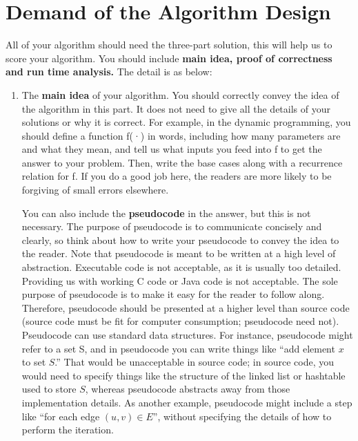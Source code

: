\documentclass[10.5pt]{article}
\newenvironment{main idea}{\textbf{Main Idea: }}{}
\theoremstyle{remark}
\begin{document}
\section*{Demand of the Algorithm Design}
All of your algorithm should need the three-part solution, this will help us to score your algorithm. You should include {\large\textbf{main idea,  proof of correctness and run time analysis.}} The detail is as below:
\begin{enumerate}

	\item The {\textbf{main idea}} of your algorithm. You should correctly convey the idea of the algorithm in this part. It does not need to give all the details of your solutions or why it is correct. For example, in the dynamic programming, you should define a function f(·) in words, including how many parameters are and what they mean, and tell us what inputs you feed into f to get the answer to your problem. Then, write the base cases along with a recurrence relation for f. If you do a good job here, the readers are more likely to be forgiving of small errors elsewhere.

	      You can also include the {\textbf{pseudocode}} in the answer, but this is not necessary. The purpose of pseudocode is to communicate concisely and clearly, so think about how to write your pseudocode to convey the idea to the
	      reader.
	      Note that pseudocode is meant to be written at a high level of abstraction. Executable code is
	      not acceptable, as it is usually too detailed. Providing us with working C code or Java code
	      is not acceptable. The sole purpose of pseudocode is to make it easy for the reader to follow
	      along. Therefore, pseudocode should be presented at a higher level than source code (source
	      code must be fit for computer consumption; pseudocode need not). Pseudocode can use
	      standard data structures. For instance, pseudocode might refer to a set S, and in pseudocode
	      you can write things like “add element $x$ to set $S$.” That would be unacceptable in source
	      code; in source code, you would need to specify things like the structure of the linked list
	      or hashtable used to store $S$, whereas pseudocode abstracts away from those implementation
	      details. As another example, pseudocode might include a step like “for each edge $(u, v) \in E$”,
	      without specifying the details of how to perform the iteration.


\end{enumerate}
\end{document}
